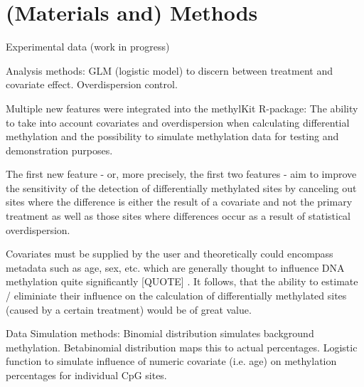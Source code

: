 \section{(Materials and) Methods}

Experimental data (work in progress)

Analysis methods: GLM (logistic model) to discern between treatment and covariate effect. 
Overdispersion control.

Multiple new features were integrated into the methylKit R-package: The ability to take into account covariates and overdispersion when calculating differential methylation and the possibility to simulate methylation data for testing and demonstration purposes.

The first new feature - or, more precisely, the first two features - aim to  improve the sensitivity of the detection of differentially methylated sites by canceling out sites where the difference is either the result of a covariate and not the primary treatment as well as those sites where differences occur as a result of statistical overdispersion.

Covariates must be supplied by the user and theoretically could encompass metadata such as age, sex, etc. which are generally thought to influence DNA methylation quite significantly [QUOTE] . It follows, that the ability to estimate / eliminiate their influence on the calculation of differentially methylated sites (caused by a certain treatment) would be of great value.

Data Simulation methods: Binomial distribution simulates background methylation. 
Betabinomial distribution maps this to actual percentages.
Logistic function to simulate influence of numeric covariate (i.e. age) on methylation percentages for individual CpG sites.
  